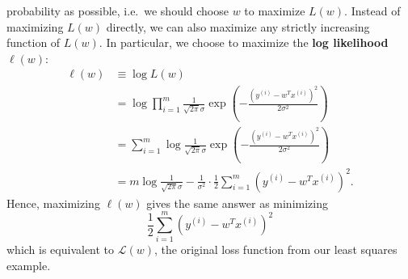 \documentclass[../main.tex]{subfiles}
\begin{document}
probability as possible, i.e.\ we should choose $w$ to maximize $L(w)$.
%
Instead of maximizing $L(w)$ directly, we can also maximize any strictly increasing function of $L(w)$.
%
In particular, we choose to maximize the \textbf{log likelihood} $\ell(w)$:
%
\begin{align}
  \ell(w) &\equiv \log{L(w)}\\
          &= \log\prod_{i=1}^{m} \frac{1}{\sqrt{2\pi}\sigma}\exp{\left(- \frac{{(y^{(i)} -
            w^{T}x^{(i)})}^{2}}{2\sigma^{2}}\right)}\\
          &= \sum_{i=1}^{m} \log\frac{1}{\sqrt{2\pi}\sigma}\exp{\left(- \frac{{(y^{(i)} -
            w^{T}x^{(i)})}^{2}}{2\sigma^{2}}\right)}\\
          &= m \log \frac{1}{\sqrt{2\pi}\sigma} - \frac{1}{\sigma^{2}} \cdot \frac{1}{2} \sum_{i=1}^{m}{\left(y^{(i)} -
            w^{T} x^{(i)}\right)}^{2}.
\end{align}
%
Hence, maximizing $\ell(w)$ gives the same answer as minimizing
%
\begin{equation}
  \frac{1}{2}\sum_{i=1}^{m}{\left(y^{(i)} - w^{T} x^{(i)}\right)}^{2}
\end{equation}
which is equivalent to $\mathcal{L}(w)$, the original loss function from our least squares example.
\end{document}
